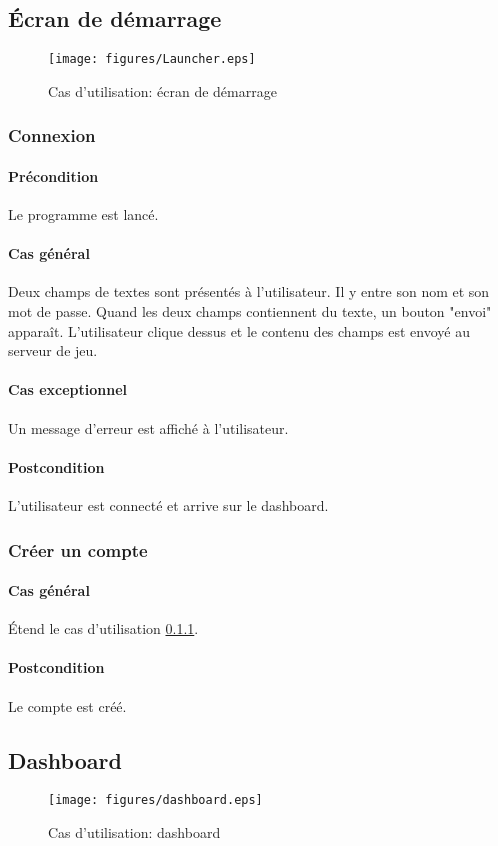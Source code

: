 \subsection{\'Ecran de démarrage}
\begin{figure}[h!]
    \centering
    \texttt{[image: figures/Launcher.eps]}
    \caption{\label{fig:UC:launcher} Cas d'utilisation: écran de démarrage}
\end{figure}

\subsubsection{Connexion}
    \label{UC:login}
    \paragraph{Précondition} Le programme est lancé.
    \paragraph{Cas général} Deux champs de textes sont présentés à l'\gls{utilisateur}. Il y entre son nom et son mot de passe. Quand les deux champs contiennent du texte, un bouton "envoi" apparaît. L'utilisateur clique dessus et le contenu des champs est envoyé au serveur de jeu.
    \paragraph{Cas exceptionnel} Un message d'erreur est affiché à l'utilisateur.
    \paragraph{Postcondition} L'utilisateur est connecté et arrive sur le dashboard.

\subsubsection{Créer un compte}
    \paragraph{Cas général} \'Etend le cas d'utilisation \ref{UC:login}.
    \paragraph{Postcondition} Le compte est créé.

\subsection{Dashboard}
\begin{figure}[h!]
    \centering
    \texttt{[image: figures/dashboard.eps]}
    \caption{\label{fig:UC:dashboard} Cas d'utilisation: dashboard}
\end{figure}

